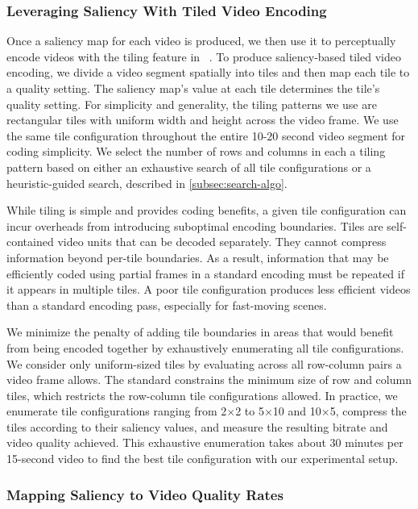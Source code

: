 \subsubsection{Leveraging Saliency With Tiled Video Encoding}
\label{subsec:tiles}

Once a saliency map for each video is produced, we then use it to perceptually encode videos with the tiling feature in \hevc~\cite{hevc}.
To produce saliency-based tiled video encoding, we divide a video segment spatially into tiles and then map each tile to a quality setting.
The saliency map's value at each tile determines the tile's quality setting.
For simplicity and generality, the tiling patterns we use are rectangular tiles with uniform width and height across the video frame.
We use the same tile configuration throughout the entire 10-20 second video segment for coding simplicity.
We select the number of rows and columns in each a tiling pattern based on either an exhaustive search of all tile configurations or a heuristic-guided search, described in \ref{subsec:search-algo}.

While tiling is simple and provides coding benefits, a given tile configuration can incur overheads from introducing suboptimal encoding boundaries.
Tiles are self-contained video units that can be decoded separately.
They cannot compress information beyond per-tile boundaries.
As a result, information that may be efficiently coded using partial frames in a standard encoding must be repeated if it appears in multiple tiles.
A poor tile configuration produces less efficient videos than a standard encoding pass, especially for fast-moving scenes.

We minimize the penalty of adding tile boundaries in areas that would benefit from being encoded together by exhaustively enumerating all tile configurations.
We consider only uniform-sized tiles by evaluating across all row-column pairs a video frame allows.
The \hevc standard constrains the minimum size of row and column tiles, which restricts the row-column tile configurations allowed.
In practice, we enumerate tile configurations ranging from 2$\times$2 to 5$\times$10 and 10$\times$5, compress the tiles according to their saliency values, and measure the resulting bitrate and video quality achieved.
This exhaustive enumeration takes about 30 minutes per 15-second video to find the best tile configuration with our experimental setup.

\saliencyTilesOverviewFigure

\subsubsection{Mapping Saliency to Video Quality Rates}
\label{subsec:mapping}

